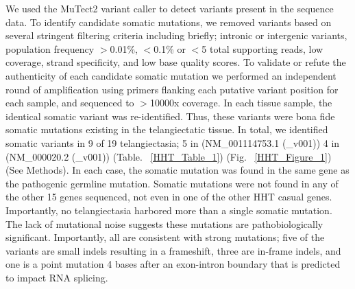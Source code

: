 We used the MuTect2 variant caller to detect variants present in the sequence data. To identify candidate somatic mutations, we removed variants based on several stringent filtering criteria including briefly; intronic or intergenic variants, population frequency $>$0.01\%, $<$0.1\% or $<$5 total supporting reads, low coverage, strand specificity, and low base quality scores. 
To validate or refute the authenticity of each candidate somatic mutation we performed an independent round of amplification using primers flanking each putative variant position for each sample, and sequenced to $>$10000x coverage.   In each tissue sample, the identical somatic variant was re-identified.  Thus, these variants were bona fide somatic mutations existing in the telangiectatic tissue. In total, we identified somatic variants in 9 of 19 telangiectasia; 5 in (NM\_001114753.1 (\_v001)) 4 in (NM\_000020.2 (\_v001)) (Table. ~\ref{HHT_Table_1}) (Fig. ~\ref{HHT_Figure_1}) (See Methods). In each case, the somatic mutation was found in the same gene as the pathogenic germline mutation.   Somatic mutations were not found in any of the other 15 genes sequenced, not even in one of the other HHT casual genes.  Importantly, no telangiectasia harbored more than a single somatic mutation. The lack of mutational noise suggests these mutations are pathobiologically significant.  Importantly, all are consistent with strong mutations; five of the variants are small indels resulting in a frameshift, three are in-frame indels, and one is a point mutation 4 bases after an exon-intron boundary that is predicted to impact RNA splicing.

\setlength{\rotFPtop}{20pt plus 1fil}
\setlength{\rotFPbot}{-5pt plus 1fil}



